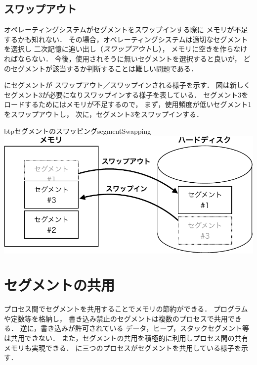 \subsection{スワップアウト}
オペレーティングシステムがセグメントをスワップインする際に
メモリが不足するかも知れない．
その場合，オペレーティングシステムは適切なセグメントを選択し
二次記憶に追い出し（\emph{スワップアウト}し），
メモリに空きを作らなければならない．
今後，使用されそうに無いセグメントを選択すると良いが，
どのセグメントが該当するか判断することは難しい問題である．

にセグメントが
スワップアウト／スワップインされる様子を示す．
図は新しくセグメント3が必要になりスワップインする様子を表している．
セグメント3をロードするためにはメモリが不足するので，
まず，使用頻度が低いセグメント1をスワップアウトし，
次に，セグメント3をスワップインする．

\begin{myfig}{btp}{セグメントのスワッピング}{segmentSwapping}
  \includegraphics[scale=0.66]{Fig/segmentSwapping-crop.pdf}
\end{myfig}

\section{セグメントの共用}
プロセス間でセグメントを共用することでメモリの節約ができる．
プログラムや定数等を格納し，
書き込み禁止のセグメントは複数のプロセスで共用できる．
逆に，書き込みが許可されている
データ，ヒープ，スタックセグメント等は共用できない．
また，セグメントの共用を積極的に利用しプロセス間の共有メモリも実現できる．
に三つのプロセスがセグメントを共用している様子を示す．


